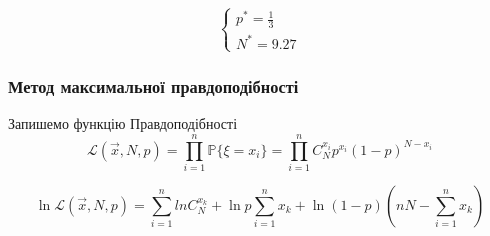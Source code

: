 \documentclass{article}
\begin{document}
$$
\begin{cases}
    p^* = \frac{1}{3} \\ 
    N^* = 9.27 
\end{cases}
$$

\subsubsection{Метод максимальної правдоподібності}
Запишемо функцію Правдоподібності
$$
\mathcal{L}(\overrightarrow{x}, N, p) = \prod_{i=1}^{n} \mathbb{P} \{ \xi=x_i \} =  \prod_{i=1}^{n}
C_N^{x_i} p^{x_i} (1-p)^{N-x_i}
$$

$$
\ln\mathcal{L}(\overrightarrow{x}, N, p) = \sum_{i=1}^n lnC_N^{x_k} + \ln p \sum_{i=1}^n x_k +
\ln(1-p)\left( nN -  \sum_{i=1}^n x_k \right)
$$
\end{document}
